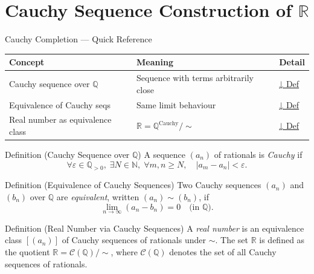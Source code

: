 
\section{Cauchy Sequence Construction of $\mathbb{R}$}

\begin{toolkitbox}{Cauchy Completion — Quick Reference}
\small
\begin{tabular}{l l l}
\toprule
\textbf{Concept} & \textbf{Meaning} & \textbf{Detail} \\
\midrule
Cauchy sequence over $\mathbb{Q}$ & Sequence with terms arbitrarily close & \hyperref[def:cauchy-q]{↓ Def} \\
Equivalence of Cauchy seqs        & Same limit behaviour & \hyperref[def:cauchy-equiv]{↓ Def} \\
Real number as equivalence class  & $\mathbb{R} = \mathbb{Q}^{\text{Cauchy}} / {\sim}$ & \hyperref[def:real-as-cauchy]{↓ Def} \\
\bottomrule
\end{tabular}
\end{toolkitbox}


\begin{definitionbox}{Definition (Cauchy Sequence over $\mathbb{Q}$)}
\label{def:cauchy-q}
A sequence $(a_n)$ of rationals is \emph{Cauchy} if
\[
  \forall \varepsilon \in \mathbb{Q}_{>0},\;
  \exists N \in \mathbb{N},\;
  \forall m, n \geq N,\quad |a_m - a_n| < \varepsilon.
\]
\end{definitionbox}

\begin{definitionbox}{Definition (Equivalence of Cauchy Sequences)}
\label{def:cauchy-equiv}
Two Cauchy sequences $(a_n)$ and $(b_n)$ over $\mathbb{Q}$ are
\emph{equivalent}, written $(a_n) \sim (b_n)$, if
\[
  \lim_{n\to\infty}(a_n - b_n) = 0 \quad \text{(in } \mathbb{Q}\text{)}.
\]
\end{definitionbox}

\begin{definitionbox}{Definition (Real Number via Cauchy Sequences)}
\label{def:real-as-cauchy}
A \emph{real number} is an equivalence class $[(a_n)]$ of Cauchy sequences
of rationals under $\sim$.
The set $\mathbb{R}$ is defined as the quotient
$\mathbb{R} = \mathcal{C}(\mathbb{Q}) / {\sim}$,
where $\mathcal{C}(\mathbb{Q})$ denotes the set of all Cauchy sequences
of rationals.
\end{definitionbox}

